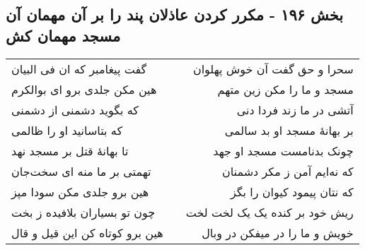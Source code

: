 \begin{center}
\section*{بخش ۱۹۶ - مکرر کردن عاذلان پند را بر آن مهمان آن مسجد مهمان کش}
\label{sec:sh196}
\begin{longtable}{l p{0.5cm} r}
گفت پیغامبر که ان فی البیان
&&
سحرا و حق گفت آن خوش پهلوان
\\
هین مکن جلدی برو ای بوالکرم
&&
مسجد و ما را مکن زین متهم
\\
که بگوید دشمنی از دشمنی
&&
آتشی در ما زند فردا دنی
\\
که بتاسانید او را ظالمی
&&
بر بهانهٔ مسجد او بد سالمی
\\
تا بهانهٔ قتل بر مسجد نهد
&&
چونک بدنامست مسجد او جهد
\\
تهمتی بر ما منه ای سخت‌جان
&&
که نه‌ایم آمن ز مکر دشمنان
\\
هین برو جلدی مکن سودا مپز
&&
که نتان پیمود کیوان را بگز
\\
چون تو بسیاران بلافیده ز بخت
&&
ریش خود بر کنده یک یک لخت لخت
\\
هین برو کوتاه کن این قیل و قال
&&
خویش و ما را در میفکن در وبال
\\
\end{longtable}
\end{center}
